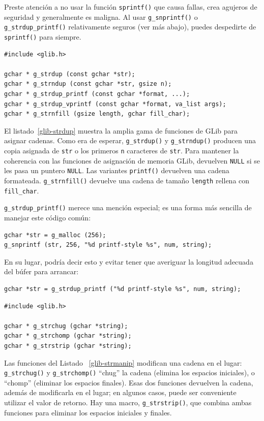 Preste atención a no usar la función \lstinline{sprintf()} que causa fallas, crea agujeros de seguridad y generalmente es maligna. Al usar \lstinline{g_snprintf()} o \lstinline{g_strdup_printf()} relativamente seguros (ver más abajo), puedes despedirte de \lstinline{sprintf()} para siempre.

\begin{lstlisting}[float, caption={Asignar cadenas}, label=glib-strdup]
#include <glib.h>

gchar * g_strdup (const gchar *str);
gchar * g_strndup (const gchar *str, gsize n);
gchar * g_strdup_printf (const gchar *format, ...);
gchar * g_strdup_vprintf (const gchar *format, va_list args);
gchar * g_strnfill (gsize length, gchar fill_char);
\end{lstlisting}

El listado~\ref{glib-strdup} muestra la amplia gama de funciones de GLib para asignar cadenas. Como era de esperar, \lstinline{g_strdup()} y \lstinline{g_strndup()} producen una copia asignada de \lstinline{str} o los primeros \lstinline{n} caracteres de \lstinline{str}. Para mantener la coherencia con las funciones de asignación de memoria GLib, devuelven \lstinline{NULL} si se les pasa un puntero \lstinline{NULL}. Las variantes \lstinline{printf()} devuelven una cadena formateada. \lstinline{g_strnfill()} devuelve una cadena de tamaño \lstinline{length} rellena con \lstinline{fill_char}.

\lstinline{g_strdup_printf()} merece una mención especial; es una forma más sencilla de manejar este código común:
\begin{lstlisting}
gchar *str = g_malloc (256);
g_snprintf (str, 256, "%d printf-style %s", num, string);
\end{lstlisting}

En su lugar, podría decir esto y evitar tener que averiguar la longitud adecuada del búfer para arrancar:
\begin{lstlisting}
gchar *str = g_strdup_printf ("%d printf-style %s", num, string);
\end{lstlisting}

\begin{lstlisting}[float, caption={Modificaciones de cadenas in situ}, label=glib-strmanip]
#include <glib.h>

gchar * g_strchug (gchar *string);
gchar * g_strchomp (gchar *string);
gchar * g_strstrip (gchar *string);
\end{lstlisting}

Las funciones del Listado ~\ref{glib-strmanip} modifican una cadena en el lugar: \lstinline{g_strchug()} y \lstinline{g_strchomp()} ``chug'' la cadena (elimina los espacios iniciales), o ``chomp'' (eliminar los espacios finales). Esas dos funciones devuelven la cadena, además de modificarla en el lugar; en algunos casos, puede ser conveniente utilizar el valor de retorno. Hay una macro, \lstinline{g_strstrip()}, que combina ambas funciones para eliminar los espacios iniciales y finales.

